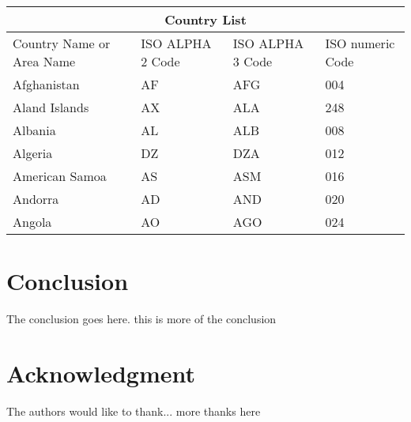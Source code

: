 \documentclass[10pt, conference, compsocconf]{IEEEtran}
\begin{document}
\begin{table}[ht]
\centering
\begin{tabular}{ |p{3cm}||p{3cm}|p{3cm}|p{3cm}|  }
 \hline
 \multicolumn{4}{|c|}{Country List} \\
 \hline
 Country Name     or Area Name& ISO ALPHA 2 Code &ISO ALPHA 3 Code&ISO numeric Code\\
 \hline
 Afghanistan   & AF    &AFG&   004\\
 Aland Islands&   AX  & ALA   &248\\
 Albania &AL & ALB&  008\\
 Algeria    &DZ & DZA&  012\\
 American Samoa&   AS  & ASM&016\\
 Andorra& AD  & AND   &020\\
 Angola& AO  & AGO&024\\
 \hline
\end{tabular}
\end{table}



\section{Conclusion}
The conclusion goes here. this is more of the conclusion



\section*{Acknowledgment}


The authors would like to thank...
more thanks here








\end{document}
